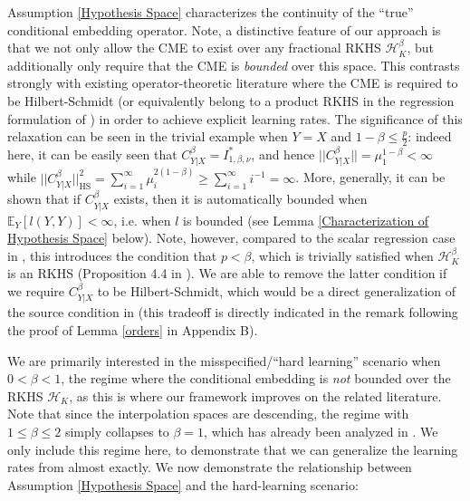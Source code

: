 \documentclass[accepted]{article}
\theoremstyle{definition}
\begin{document}
\par Assumption \ref{Hypothesis Space} characterizes the continuity of the ``true'' conditional embedding operator. Note, a distinctive feature of our approach is that we not only allow the CME to exist over any fractional RKHS $\mathcal{H}^{\beta}_K$, but additionally only require that the CME is \textit{bounded} over this space. This contrasts strongly with existing operator-theoretic literature \citep{song2009hilbert, song2010nonparametric} where the CME is required to be Hilbert-Schmidt (or equivalently belong to a product RKHS in the regression formulation of \cite{park2020measure}) in order to achieve explicit learning rates. The significance of this relaxation can be seen in the trivial example when $Y = X$ and $1 - \beta \leq \frac{p}{2}$: indeed here, it can be easily seen that $C^{\beta}_{Y|X} = I^{*}_{1, \beta, \nu}$, and hence $||C^{\beta}_{Y|X}||  = \mu^{1 - \beta}_1 < \infty$ while $||C^{\beta}_{Y|X}||^2_{\text{HS}} = \sum_{i = 1}^{\infty} \mu^{2(1 - \beta)}_i \geq \sum_{i = 1}^{\infty} i^{-1} = \infty$. More, generally, it can be shown that if $C^{\beta}_{Y|X}$ exists, then it is automatically bounded when $\mathbb{E}_{Y}[l(Y, Y)] < \infty$, i.e. when $l$ is bounded (see Lemma \ref{Characterization of Hypothesis Space} below). Note, however, compared to the scalar regression case in \cite{fischer2020sobolev}, this introduces the condition that $p < \beta$, which is trivially satisfied when $\mathcal{H}_{K}^{\beta}$ is an RKHS (Proposition 4.4 in \cite{steinwart2012mercer}). We are able to remove the latter condition if we require $C^{\beta}_{Y|X}$ to be Hilbert-Schmidt, which would be a direct generalization of the source condition in \cite{fischer2020sobolev} (this tradeoff is directly indicated in the remark following the proof of Lemma \ref{orders} in Appendix B). 

\par We are primarily interested in the misspecified/``hard learning'' scenario when $0 < \beta < 1$, the regime where the conditional embedding is \textit{not} bounded over the RKHS $\mathcal{H}_K$, as this is where our framework improves on the related literature. Note that since the interpolation spaces are descending, the regime with $1 \leq \beta \leq 2$ simply collapses to $\beta = 1$, which has already been analyzed in \cite{song2010nonparametric}. We only include this regime here, to demonstrate that we can generalize the learning rates from \cite{fischer2020sobolev} almost exactly. We now demonstrate the relationship between Assumption \ref{Hypothesis Space} and the hard-learning scenario:
\end{document}
